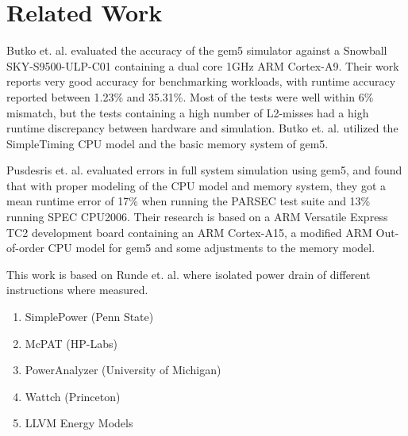 \section{Related Work}

Butko et. al. \cite{butko2012accuracy} evaluated the accuracy of the gem5
simulator against a Snowball SKY-S9500-ULP-C01 containing a dual core 1GHz ARM
Cortex-A9.  Their work reports very good accuracy for benchmarking workloads,
with runtime accuracy reported between 1.23\% and 35.31\%.  Most of the tests
were well within 6\% mismatch, but the tests containing a high number of
L2-misses had a high runtime discrepancy between hardware and simulation. Butko et. al.
utilized the SimpleTiming CPU model and the basic memory system of gem5.

Pusdesris et. al. \cite{pusdesrissources} evaluated errors in full system
simulation using gem5, and found that with proper modeling of the CPU model
and memory system, they got a mean runtime error of 17\% when running the PARSEC
test suite and 13\% running SPEC CPU2006. Their research is based on a ARM
Versatile Express TC2 development board containing an ARM Cortex-A15, a modified
ARM Out-of-order CPU model for gem5 and some adjustments to the memory model.

This work is based on Runde et. al. \cite{rundehvatum2013exploring} where isolated
power drain of different instructions where measured.

\begin{enumerate}
    \item SimplePower (Penn State)
    \item McPAT (HP-Labs)
    \item PowerAnalyzer (University of Michigan)
    \item Wattch (Princeton)
    \item LLVM Energy Models
\end{enumerate}
